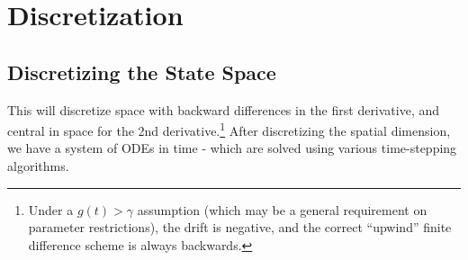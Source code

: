 \documentclass[11pt]{article}
\begin{document}
\appendix
\makeatletter
\def\@seccntformat#1{Appendix\ \csname the#1\endcsname\quad}
\makeatother
\makeatletter
\def\@seccntformat#1{\csname Pref@#1\endcsname \csname the#1\endcsname\quad}
\def\Pref@section{Appendix~}
\makeatother
{}
\let\normalsize\small
\small
\section{Discretization}\label{sec:discretization}
\subsection{Discretizing the State Space}\label{eq:discretization}
This will discretize space with backward differences in the first derivative, and central in space for the 2nd derivative.\footnote{Under a $g(t) > \gamma$ assumption (which may be a general requirement on parameter restrictions), the drift is negative, and the correct ``upwind'' finite difference scheme is always backwards.}  After discretizing the spatial dimension, we have a system of ODEs in time - which are solved using various time-stepping algorithms.
\end{document}
